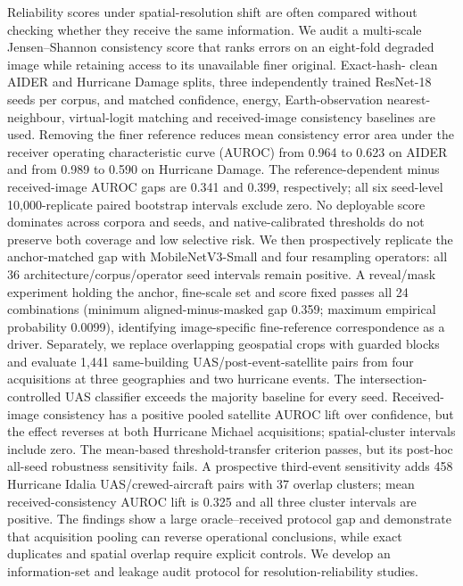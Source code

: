 Reliability scores under spatial-resolution shift are often compared without
checking whether they receive the same information. We audit a multi-scale
Jensen--Shannon consistency score that ranks errors on an eight-fold degraded
image while retaining access to its unavailable finer original. Exact-hash-
clean AIDER and Hurricane Damage splits, three independently trained ResNet-18
seeds per corpus, and matched confidence, energy, Earth-observation nearest-
neighbour, virtual-logit matching and received-image consistency baselines are
used. Removing the finer reference reduces mean consistency error area under
the receiver operating characteristic curve (AUROC) from
0.964 to 0.623 on AIDER and from 0.989 to 0.590 on Hurricane Damage.
The reference-dependent minus received-image AUROC gaps are 0.341 and 0.399,
respectively; all six seed-level 10,000-replicate paired bootstrap intervals
exclude zero. No
deployable score dominates across corpora and seeds, and native-calibrated
thresholds do not preserve both coverage and low selective risk. We then
prospectively replicate the anchor-matched gap with MobileNetV3-Small and four
resampling operators: all 36 architecture/corpus/operator seed intervals remain
positive. A reveal/mask experiment holding the anchor, fine-scale set and score
fixed passes all 24 combinations (minimum aligned-minus-masked gap 0.359;
maximum empirical probability 0.0099), identifying image-specific
fine-reference correspondence as a driver. Separately, we
replace overlapping geospatial crops with guarded blocks and evaluate 1,441
same-building UAS/post-event-satellite pairs from four acquisitions at three
geographies and two hurricane events. The intersection-controlled UAS
classifier exceeds the majority baseline for every seed. Received-image
consistency has a positive pooled satellite AUROC lift over confidence, but the
effect reverses at both Hurricane Michael acquisitions; spatial-cluster
intervals include zero. The mean-based threshold-transfer criterion passes,
but its post-hoc all-seed robustness sensitivity fails. A prospective
third-event sensitivity adds 458 Hurricane Idalia UAS/crewed-aircraft pairs
with 37 overlap clusters; mean received-consistency AUROC lift is 0.325 and all
three cluster intervals are positive. The findings show a
large oracle--received protocol gap and demonstrate that acquisition pooling
can reverse operational conclusions, while exact duplicates and spatial
overlap require explicit controls. We develop an information-set and leakage
audit protocol for resolution-reliability studies.
